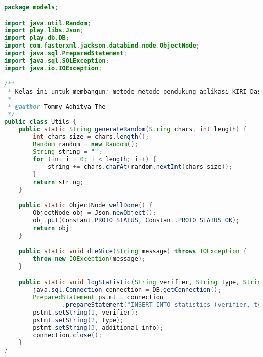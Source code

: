 \begin{lstlisting}[language=Java,basicstyle=\tiny,caption=models/Utils.java,label={lst:utils.java}]
package models;

import java.util.Random;
import play.libs.Json;
import play.db.DB;
import com.fasterxml.jackson.databind.node.ObjectNode;
import java.sql.PreparedStatement;
import java.sql.SQLException;
import java.io.IOException;

/**
 * Kelas ini untuk membangun: metode-metode pendukung aplikasi KIRI Dashboard
 * 
 * @author Tommy Adhitya The
 */
public class Utils {
	public static String generateRandom(String chars, int length) {
		int chars_size = chars.length();
		Random random = new Random();
		String string = "";
		for (int i = 0; i < length; i++) {
			string += chars.charAt(random.nextInt(chars_size));
		}
		return string;
	}

	public static ObjectNode wellDone() {
		ObjectNode obj = Json.newObject();
		obj.put(Constant.PROTO_STATUS, Constant.PROTO_STATUS_OK);
		return obj;
	}

	public static void dieNice(String message) throws IOException {
		throw new IOException(message);
	}

	public static void logStatistic(String verifier, String type, String additional_info) throws SQLException {
		java.sql.Connection connection = DB.getConnection();
		PreparedStatement pstmt = connection
				.prepareStatement("INSERT INTO statistics (verifier, type, additionalInfo) VALUES (?,?,?)");
		pstmt.setString(1, verifier);
		pstmt.setString(2, type);
		pstmt.setString(3, additional_info);
		connection.close();
	}
}
\end{lstlisting}
